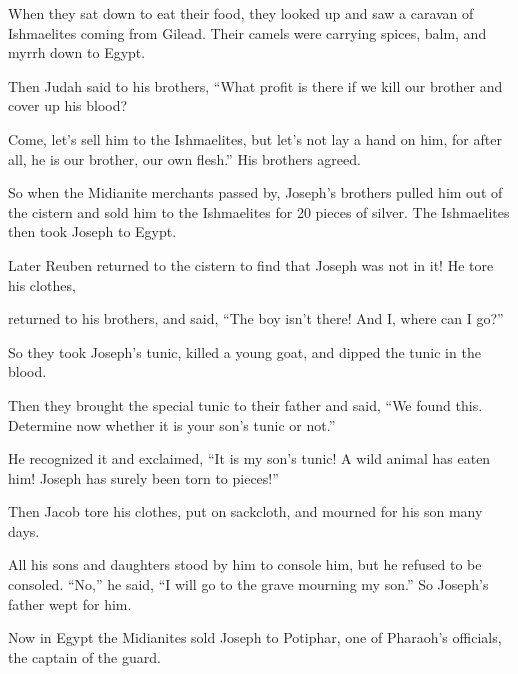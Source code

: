 \begin{scripture}
 When they sat down to eat their food, they looked up and saw a caravan of Ishmaelites coming from Gilead. Their camels were carrying spices, balm, and myrrh down to Egypt.
 Then Judah said to his brothers, ``What profit is there if we kill our brother and cover up his blood?
 Come, let's sell him to the Ishmaelites, but let's not lay a hand on him, for after all, he is our brother, our own flesh.'' His brothers agreed.
 So when the Midianite merchants passed by, Joseph's brothers pulled him out of the cistern and sold him to the Ishmaelites for 20 pieces of silver. The Ishmaelites then took Joseph to Egypt.
\everypar{}

 Later Reuben returned to the cistern to find that Joseph was not in it! He tore his clothes,
 returned to his brothers, and said, ``The boy isn't there! And I, where can I go?''
 So they took Joseph's tunic, killed a young goat, and dipped the tunic in the blood.
 Then they brought the special tunic to their father and said, ``We found this. Determine now whether it is your son's tunic or not.''
\everypar{}

 He recognized it and exclaimed, ``It is my son's tunic! A wild animal has eaten him! Joseph has surely been torn to pieces!''
 Then Jacob tore his clothes, put on sackcloth, and mourned for his son many days.
 All his sons and daughters stood by him to console him, but he refused to be consoled. ``No,'' he said, ``I will go to the grave mourning my son.'' So Joseph's father wept for him.
\everypar{}

 Now in Egypt the Midianites sold Joseph to Potiphar, one of Pharaoh's officials, the captain of the guard.


\end{scripture}
